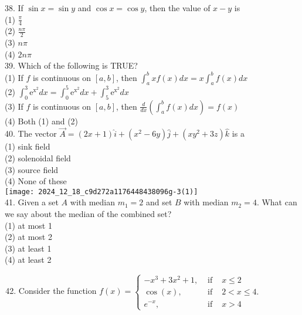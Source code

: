 \documentclass[10pt]{article}
\begin{document}
38. If $\sin x=\sin y$ and $\cos x=\cos y$, then the value of $x-y$ is\\
(1) $\frac{\pi}{4}$\\
(2) $\frac{n \pi}{2}$\\
(3) $n \pi$\\
(4) $2 n \pi$\\
39. Which of the following is TRUE?\\
(1) If $f$ is continuous on $[a, b]$, then $\int_{a}^{b} x f(x) d x=x \int_{a}^{b} f(x) d x$\\
(2) $\int_{0}^{3} \mathrm{e}^{\mathrm{x}^{2}} d x=\int_{0}^{5} \mathrm{e}^{\mathrm{x}^{2}} d x+\int_{5}^{3} \mathrm{e}^{\mathrm{x}^{2}} d x$\\
(3) If $f$ is continuous on $[a, b]$, then $\frac{d}{d x}\left(\int_{a}^{b} f(x) d x\right)=f(x)$\\
(4) Both (1) and (2)\\
40. The vector $\vec{A}=(2 x+1) \hat{i}+\left(x^{2}-6 y\right) \hat{j}+\left(x y^{2}+3 z\right) \hat{k}$ is a\\
(1) sink field\\
(2) solenoidal field\\
(3) source field\\
(4) None of these\\
\texttt{[image: 2024\_12\_18\_c9d272a1176448438096g-3(1)]}\\
41. Given a set $A$ with median $m_{1}=2$ and set $B$ with median $m_{2}=4$. What can we say about the median of the combined set?\\
(1) at most 1\\
(2) at most 2\\
(3) at least 1\\
(4) at least 2

\begin{enumerate}
  \setcounter{enumi}{41}
  \item Consider the function $f(x)=\left\{\begin{array}{ccc}-x^{3}+3 x^{2}+1, & \text { if } & x \leq 2 \\ \cos (x), & \text { if } & 2<x \leq 4 . \\ e^{-x}, & \text { if } & x>4\end{array}\right.$
\end{enumerate}
\end{document}
